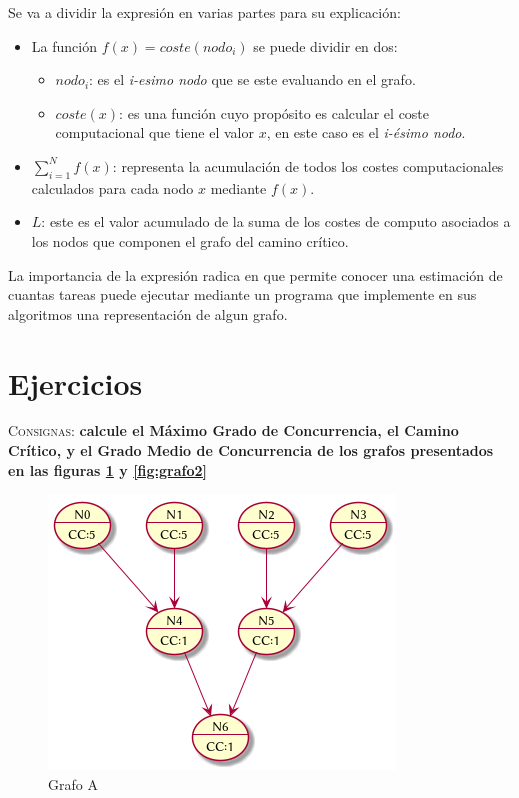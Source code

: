 \documentclass{article}
\begin{document}
Se va a dividir la expresi\'on en varias partes para su explicaci\'on:
\begin{itemize}
\item La funci\'on $f(x)=coste(nodo_{i})$ se puede dividir en dos:
	\begin{itemize}
	\item $nodo_{i}$: es el \textit{i-esimo nodo} que se este evaluando en el grafo.
	\item $coste(x)$: es una funci\'on cuyo prop\'osito es calcular el coste
computacional que tiene el valor $x$, en este caso es el \textit{i-\'esimo
nodo}.
\end{itemize}
\item $\sum_{i=1}^{N} f(x)$: representa la acumulaci\'on de todos los costes
computacionales calculados para cada nodo $x$ mediante $f(x)$.
\item $L$: este es el valor acumulado de la suma de los costes de computo
asociados a los nodos que componen el grafo del camino cr\'itico.
\end{itemize}

La importancia de la expresi\'on radica en que permite conocer una estimaci\'on
de cuantas tareas puede ejecutar mediante un programa que implemente en sus algoritmos
una representaci\'on de algun grafo.

\section{Ejercicios}
\textsc{Consignas}: \textbf{calcule el M\'aximo Grado de Concurrencia, el
Camino Cr\'itico, y el Grado Medio de Concurrencia de los grafos presentados en
las figuras \ref{fig:grafo1} y \ref{fig:grafo2}}\\

\begin{figure}[H]
  \centering
  \includegraphics[width=.4\linewidth]{grafo1}
  \caption{Grafo A}
  \label{fig:grafo1}
\end{figure}
\end{document}
